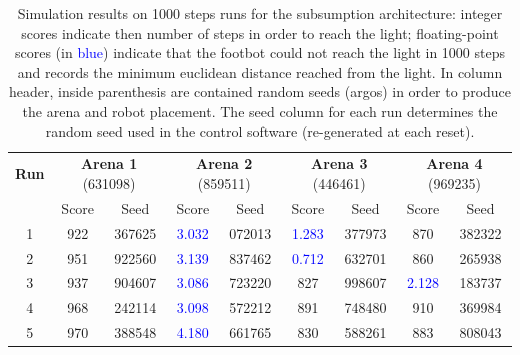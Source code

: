 \begin{table}[ht]
	\centering
	\begin{tabular}{c|cc|cc|cc|cc}
		\textbf{Run} & \multicolumn{2}{c|}{\textbf{Arena 1} (631098)} & \multicolumn{2}{c|}{\textbf{Arena 2} (859511)} & \multicolumn{2}{c|}{\textbf{Arena 3} (446461)} & \multicolumn{2}{c}{\textbf{Arena 4} (969235)}                                                                       \\
		             & Score                                          & Seed                                           & Score                                          & Seed                                          & Score                   & Seed   & Score                   & Seed   \\
		\hline
		1            & 922                                            & 367625                                         & \textcolor{blue}{3.032}                        & 072013                                        & \textcolor{blue}{1.283} & 377973 & 870                     & 382322 \\
		2            & 951                                            & 922560                                         & \textcolor{blue}{3.139}                        & 837462                                        & \textcolor{blue}{0.712} & 632701 & 860                     & 265938 \\
		3            & 937                                            & 904607                                         & \textcolor{blue}{3.086}                        & 723220                                        & 827                     & 998607 & \textcolor{blue}{2.128} & 183737 \\
		4            & 968                                            & 242114                                         & \textcolor{blue}{3.098}                        & 572212                                        & 891                     & 748480 & 910                     & 369984 \\
		5            & 970                                            & 388548                                         & \textcolor{blue}{4.180}                        & 661765                                        & 830                     & 588261 & 883                     & 808043 \\
	\end{tabular}
	\caption{Simulation results on 1000 steps runs for the subsumption
		architecture: integer scores indicate then number of steps in order to
		reach the light; floating-point scores (in \textcolor{blue}{blue}) indicate
		that the footbot could not reach the light in 1000 steps and records the
		minimum euclidean distance reached from the light. In column header, inside
		parenthesis are contained random seeds (argos) in order to produce the
		arena and robot placement. The seed column for each run determines the
		random seed used in the control software (re-generated at each reset).}
	\label{tab:simulation-results-sub}
\end{table}
